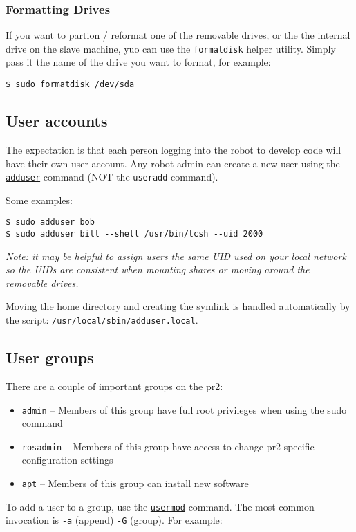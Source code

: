 \subsubsection{Formatting Drives}
If you want to partion / reformat one of the removable drives, or the
the internal drive on the slave machine, yuo can use the
\texttt{formatdisk} helper utility.  Simply pass it the name of the
drive you want to format, for example:
\begin{verbatim}
$ sudo formatdisk /dev/sda
\end{verbatim}

\subsection{User accounts}
\label{creating accounts}
The expectation is that each person logging into the robot to develop
code will have their own user account.  Any robot admin can create a
new user using the
\texttt{\href{http://unixhelp.ed.ac.uk/CGI/man-cgi?adduser}{adduser}}
command (NOT the \texttt{useradd} command).

Some examples:
\begin{verbatim}
$ sudo adduser bob
$ sudo adduser bill --shell /usr/bin/tcsh --uid 2000
\end{verbatim}

\textit{Note: it may be helpful to assign users the same UID used on
  your local network so the UIDs are consistent when mounting shares
  or moving around the removable drives.}

Moving the home directory and creating the symlink is handled
automatically by the script: \texttt{/usr/local/sbin/adduser.local}.

\subsection{User groups}
There are a couple of important groups on the pr2:
\begin{itemize}
\item \texttt{admin} -- Members of this group have full root privileges when using the sudo command
\item \texttt{rosadmin} -- Members of this group have access to change pr2-specific configuration settings
\item \texttt{apt} -- Members of this group can install new software
\end{itemize}

To add a user to a group, use the \texttt{\href{http://unixhelp.ed.ac.uk/CGI/man-cgi?usermod}{usermod}} command.  The most
common invocation is \texttt{-a} (append) \texttt{-G} (group).  For example:

